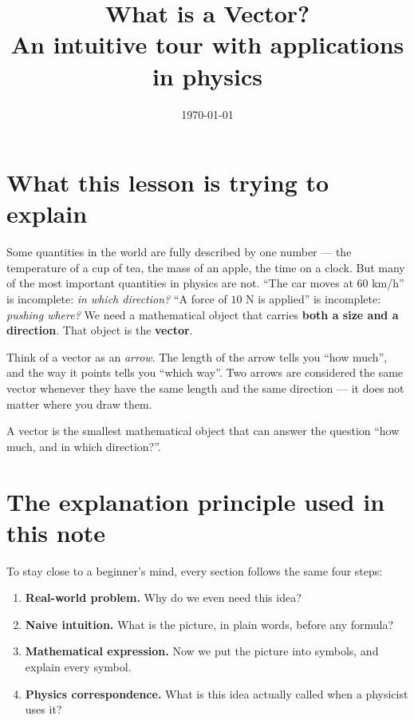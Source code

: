 \documentclass[11pt,a4paper]{article}
\title{What is a Vector?\\\large An intuitive tour with applications in physics}
\author{}
\date{\today}
\begin{document}
\maketitle
\tableofcontents
\newpage

\section{What this lesson is trying to explain}

\begin{problemblock}
Some quantities in the world are fully described by one number ---
the temperature of a cup of tea, the mass of an apple, the time on a clock.
But many of the most important quantities in physics are not.
``The car moves at $60$ km/h'' is incomplete: \emph{in which direction?}
``A force of $10$ N is applied'' is incomplete: \emph{pushing where?}
We need a mathematical object that carries \textbf{both a size and a direction}.
That object is the \textbf{vector}.
\end{problemblock}

\begin{intuitionblock}
Think of a vector as an \emph{arrow}.
The length of the arrow tells you ``how much'',
and the way it points tells you ``which way''.
Two arrows are considered the same vector whenever they have the same length
and the same direction --- it does not matter where you draw them.
\end{intuitionblock}

\begin{keypointblock}
A vector is the smallest mathematical object that can answer the question
``how much, and in which direction?''.
\end{keypointblock}

\section{The explanation principle used in this note}

To stay close to a beginner's mind, every section follows the same four steps:

\begin{enumerate}[label=\textbf{\arabic*.}]
  \item \textbf{Real-world problem.} Why do we even need this idea?
  \item \textbf{Naive intuition.} What is the picture, in plain words, before any formula?
  \item \textbf{Mathematical expression.} Now we put the picture into symbols, and explain every symbol.
  \item \textbf{Physics correspondence.} What is this idea actually called when a physicist uses it?
\end{enumerate}
\end{document}
